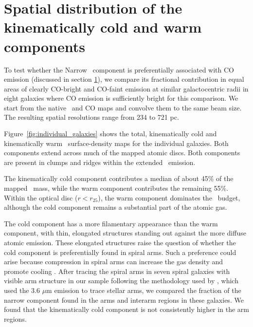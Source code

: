 


\section[Spatial distribution of the kinematically cold and warm components]{Spatial distribution of the kinematically cold and warm components}
\label{sec:phase_spatial_distribution}
To test whether the Narrow \HI\ component is preferentially associated with CO emission (discussed in section \ref{sec:phase_spatial_distribution}), we compare its fractional contribution in equal areas of clearly CO-bright and CO-faint emission at similar galactocentric radii in eight galaxies where CO emission is sufficiently bright for this comparison. We start from the native \HI\ and CO maps and convolve them to the same beam size. The resulting spatial resolutions range from 234 to 721 pc. 

Figure~\ref{fig:individual_galaxies} shows the total, kinematically cold and kinematically warm \HI\ surface-density maps for the individual galaxies. Both components extend across much of the mapped atomic discs. Both components are present in clumps and ridges within the extended \HI\ emission.


The kinematically cold component contributes a median of about 45\% of the mapped \HI\ mass, while the warm component contributes the remaining 55\%. Within the optical disc ($r<r_{25}$), the warm component dominates the \HI\ budget, although the cold component remains a substantial part of the atomic gas.

The cold component has a more filamentary appearance than the warm component, with thin, elongated structures standing out against the more diffuse atomic emission. These elongated structures raise the question of whether the cold component is preferentially found in spiral arms. Such a preference could arise because compression in spiral arms can increase the gas density and promote cooling \citep{KimSpiral2008}. After tracing the spiral arms in seven spiral galaxies with visible arm structure in our sample following the methodology used by \citet{Foyle2010}, which used the 3.6 $\mu$m emission to trace stellar arms, we compared the fraction of the narrow component found in the arms and interarm regions in these galaxies. We found that the kinematically cold component is not consistently higher in the arm regions.

